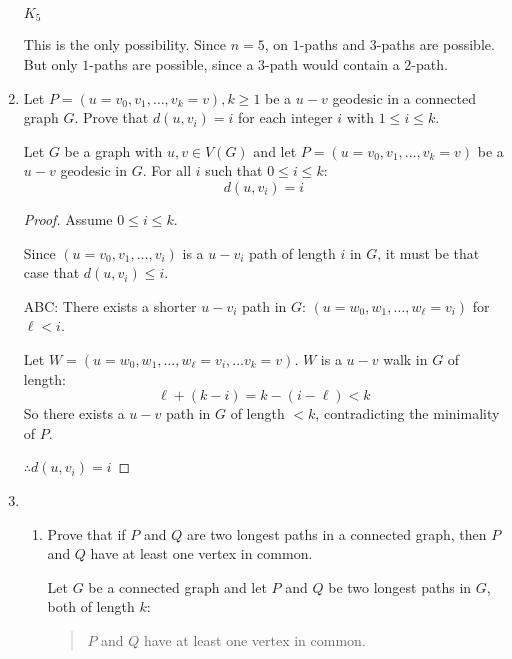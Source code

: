 \documentclass[letterpaper,12pt,fleqn]{article}
\begin{document}
\begin{enumerate}[start=11]
\begin{center}
    \(K_5\)
  \end{center}
  This is the only possibility.  Since \(n=5\), on \(1\)-paths and \(3\)-paths are possible.  But only \(1\)-paths
  are possible, since a \(3\)-path would contain a \(2\)-path.

  \bigskip

\item Let \(P=(u=v_0,v_1,\ldots,v_k=v),k\ge1\) be a \(u-v\) geodesic in a connected graph \(G\).  Prove that
  \(d(u,v_i)=i\) for each integer \(i\) with \(1\le i\le k\).

  \begin{theorem}
    Let \(G\) be a graph with \(u,v\in V(G)\) and let \(P=(u=v_0,v_1,\ldots,v_k=v)\) be a \(u-v\) geodesic in \(G\).
    For all \(i\) such that \(0\le i\le k\):
    \[d(u,v_i)=i\]
  \end{theorem}

  \begin{proof}
    Assume \(0\le i\le k\).

    Since \((u=v_0,v_1,\ldots,v_i)\) is a \(u-v_i\) path of length \(i\) in \(G\), it must be that case that
    \(d(u,v_i)\le i\).

    ABC: There exists a shorter \(u-v_i\) path in \(G\): \((u=w_0,w_1,\ldots,w_{\ell}=v_i)\) for \(\ell<i\).

    Let \(W=(u=w_0,w_1,\ldots,w_{\ell}=v_i,\ldots v_k=v)\).  \(W\) is a \(u-v\) walk in \(G\) of length:
    \[\ell+(k-i)=k-(i-\ell)<k\]
    So there exists a \(u-v\) path in \(G\) of length \(<k\), contradicting the minimality of \(P\).

    \(\therefore d(u,v_i)=i\)
  \end{proof}

  \bigskip

\item
  \begin{enumerate}
  \item Prove that if \(P\) and \(Q\) are two longest paths in a connected graph, then \(P\) and \(Q\) have at
    least one vertex in common.

    \begin{theorem}
      Let \(G\) be a connected graph and let \(P\) and \(Q\) be two longest paths in \(G\), both of length \(k\):
      \begin{quote}
        \(P\) and \(Q\) have at least one vertex in common.
      \end{quote}
    \end{theorem}


\end{enumerate}
\end{enumerate}
\end{document}
